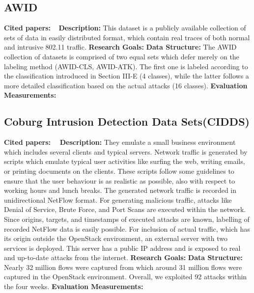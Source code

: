 \subsection{AWID}
\textbf{Cited papers:} ~\cite{kolias2016intrusion}\newline
\textbf{Description:} This dataset is a publicly available collection of sets of data in easily distributed format, which contain real traces of both normal and intrusive 802.11 traffic. \newline
\textbf{Research Goals:}  \newline
\textbf{Data Structure:} The AWID collection of datasets is comprised of two equal sets which defer merely on the labeling method (AWID-CLS, AWID-ATK). The first one is labeled according to the classification introduced in Section III-E (4 classes), while the latter follows a more detailed classification based on the actual attacks (16 classes). \newline
\textbf{Evaluation Measurements:} \newline

\subsection{Coburg Intrusion Detection Data Sets(CIDDS)}
\textbf{Cited papers:}~\cite{ring2017flow}~\cite{ring2017creation} \newline
\textbf{Description:} They emulate a small business environment which includes several clients and typical servers. Network traffic is generated by scripts which emulate typical user activities like surfing the web, writing emails, or printing documents on the clients. These scripts follow some guidelines to ensure that the user behaviour is as realistic as possible, also with respect to working hours and lunch breaks. The generated network traffic is recorded in unidirectional NetFlow format.
For generating malicious traffic, attacks like Denial of Service, Brute Force, and Port Scans are executed within
the network. Since origins, targets, and timestamps of executed attacks are known, labelling of recorded
NetFlow data is easily possible. For inclusion of actual traffic, which has its origin outside the OpenStack
environment, an external server with two services is deployed. This server has a public IP address and is
exposed to real and up-to-date attacks from the internet. \newline
\textbf{Research Goals:}  \newline
\textbf{Data Structure:} Nearly 32 million flows were captured from which around 31 million flows were captured in the OpenStack environment. Overall, we exploited 92 attacks within the four weeks.\newline
\textbf{Evaluation Measurements:} \newline


